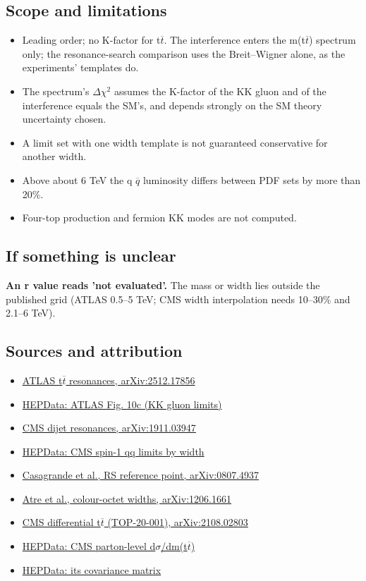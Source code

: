 \documentclass[11pt,a4paper]{article}
\begin{document}
\subsection*{Scope and limitations}
\begin{itemize}
\item Leading order; no K-factor for t\ensuremath{\overline{t}}. The interference enters the m(t\ensuremath{\overline{t}}) spectrum only; the resonance-search comparison uses the Breit--Wigner alone, as the experiments' templates do.
\item The spectrum's \ensuremath{\Delta}\ensuremath{\chi}\ensuremath{{}^{2}} assumes the K-factor of the KK gluon and of the interference equals the SM's, and depends strongly on the SM theory uncertainty chosen.
\item A limit set with one width template is not guaranteed conservative for another width.
\item Above about 6 TeV the q \ensuremath{\overline{q}} luminosity differs between PDF sets by more than 20\%.
\item Four-top production and fermion KK modes are not computed.
\end{itemize}
\subsection*{If something is unclear}
\textbf{An r value reads 'not evaluated'.} The mass or width lies outside the published grid (ATLAS 0.5--5 TeV; CMS width interpolation needs 10--30\% and 2.1--6 TeV).

\subsection*{Sources and attribution}
\begin{itemize}
\item \href{https://arxiv.org/abs/2512.17856}{ATLAS t\ensuremath{\overline{t}} resonances, arXiv:2512.17856}
\item \href{https://doi.org/10.17182/hepdata.168229.v1/t15}{HEPData: ATLAS Fig. 10c (KK gluon limits)}
\item \href{https://arxiv.org/abs/1911.03947}{CMS dijet resonances, arXiv:1911.03947}
\item \href{https://doi.org/10.17182/hepdata.91059.v1/t10}{HEPData: CMS spin-1 qq limits by width}
\item \href{https://arxiv.org/abs/0807.4937}{Casagrande et al., RS reference point, arXiv:0807.4937}
\item \href{https://arxiv.org/abs/1206.1661}{Atre et al., colour-octet widths, arXiv:1206.1661}
\item \href{https://arxiv.org/abs/2108.02803}{CMS differential t\ensuremath{\overline{t}} (TOP-20-001), arXiv:2108.02803}
\item \href{https://doi.org/10.17182/hepdata.102956.v1/t37}{HEPData: CMS parton-level d\ensuremath{\sigma}/dm(t\ensuremath{\overline{t}})}
\item \href{https://doi.org/10.17182/hepdata.102956.v1/t38}{HEPData: its covariance matrix}
\end{itemize}
\end{document}
